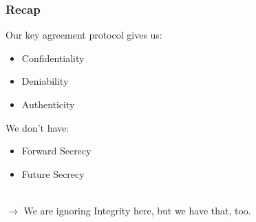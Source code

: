 \documentclass[
	aspectratio=169,
	xetex,
]{beamer}
\newcounter{i}
\begin{document}
\begin{frame}
	\frametitle{Recap}
	Our key agreement protocol gives us:
	\begin{itemize}
		\item Confidentiality
		\item Deniability
		\item Authenticity
	\end{itemize}
	We don't have:
	\begin{itemize}
		\item Forward Secrecy
		\item Future Secrecy
	\end{itemize}
	\-\\[2em]
	\alert{$\rightarrow$} We are ignoring Integrity here, but we have that, too.
\end{frame}
\end{document}
